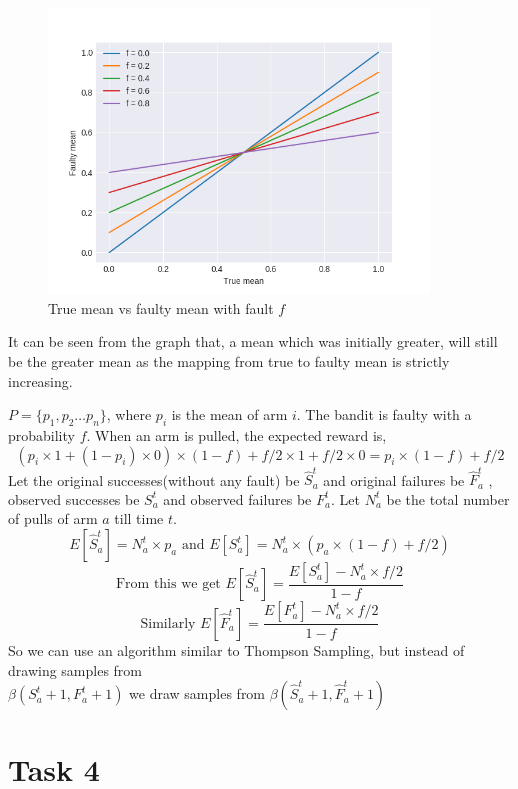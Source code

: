 \documentclass[11pt]{article}
\begin{document}
\begin{figure}[H]
    \begin{center}
        \includegraphics[width=0.9\textwidth]{../images/task3_1.png}
        
        \caption{True mean vs faulty mean with fault $f$}
    \end{center} 
\end{figure}
It can be seen from the graph that, a mean which was initially greater, will
still be the greater mean as the mapping from true to faulty mean is strictly increasing. 


$P =\{p_1, p_2 \dots p_n \}$, where $p_i$ is the mean of arm $i$.
The bandit is faulty with a probability $f$. When an arm is pulled, 
the expected reward is, $$(p_i\times1 + (1-p_i)\times0)\times(1-f) + 
f/2\times1 + f/2\times0 = p_i\times(1-f) + f/2$$
Let the original successes(without any fault) be $\hat{S}_a^t$ and original failures be  $\hat{F}_a^t$ , 
observed successes be $S_a^t$ and observed failures be $F_a^t$. Let $N_a^t$ be the total number of pulls
of arm $a$ till time $t$. 
 $$E[\hat{S}_a^t] = N_a^t \times p_a \text{ and } E[S_a^t] = N_a^t \times ( p_a\times(1-f) + f/2)$$
 $$\text{From this we get } E[\hat{S}_a^t] = \frac{E[S_a^t] - N_a^t \times f/2}{1-f}$$
 $$\text{Similarly } E[\hat{F}_a^t] = \frac{E[F_a^t] - N_a^t \times f/2}{1-f}$$
 So we can use an algorithm similar to Thompson Sampling, but instead of 
 drawing samples from \\ $\beta(S_a^t + 1, F_a^t + 1)$ we draw samples from  
 $\beta(\hat{S}_a^t+1,\hat{F}_a^t+1)$ 
\section*{Task 4}
\end{document}
